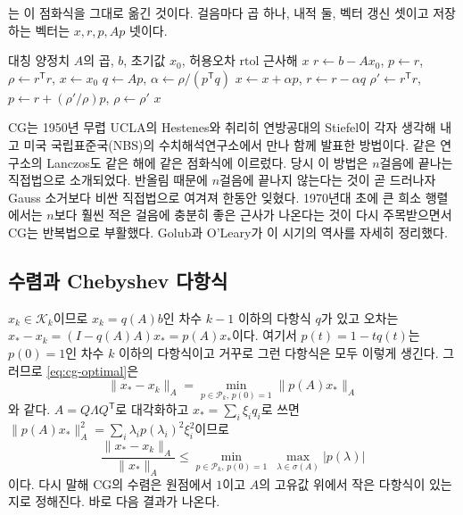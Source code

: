 는 이 점화식을 그대로 옮긴 것이다. 걸음마다 곱 하나, 내적 둘, 벡터 갱신 셋이고 저장하는 벡터는 $x,r,p,Ap$ 넷이다.

\begin{algorithm}[t]
\begin{algorithmic}[1]
\Require 대칭 양정치 $A$의 곱, $b$, 초기값 $x_0$, 허용오차 $\mathrm{rtol}$
\Ensure 근사해 $x$
\State $r\gets b-Ax_0$, $p\gets r$, $\rho\gets r^{\mathsf T}r$, $x\gets x_0$
  \State $q\gets Ap$, $\alpha\gets\rho/(p^{\mathsf T}q)$
  \State $x\gets x+\alpha p$, $r\gets r-\alpha q$ 
  \State $\rho'\gets r^{\mathsf T}r$, $p\gets r+(\rho'/\rho)p$, $\rho\gets\rho'$
\EndWhile
\State \Return $x$
\end{algorithmic}
\caption{켤레 기울기법}
\label{alg:cg}
\end{algorithm}

\begin{aside}
CG는 1950년 무렵 UCLA의 Hestenes와 취리히 연방공대의 Stiefel이 각자 생각해 내고 미국 국립표준국(NBS)의 수치해석연구소에서 만나 함께 발표한 방법이다\cite{hestenes1952}. 같은 연구소의 Lanczos도 같은 해에 같은 점화식에 이르렀다\cite{lanczos1952}. 당시 이 방법은 $n$걸음에 끝나는 직접법으로 소개되었다. 반올림 때문에 $n$걸음에 끝나지 않는다는 것이 곧 드러나자 Gauss 소거보다 비싼 직접법으로 여겨져 한동안 잊혔다. 1970년대 초에 큰 희소 행렬에서는 $n$보다 훨씬 적은 걸음에 충분히 좋은 근사가 나온다는 것이 다시 주목받으면서 CG는 반복법으로 부활했다. Golub과 O'Leary가 이 시기의 역사를 자세히 정리했다\cite{golub1989history}.
\end{aside}

\subsection{수렴과 Chebyshev 다항식}

$x_k\in\mathcal K_k$이므로 $x_k=q(A)b$인 차수 $k-1$ 이하의 다항식 $q$가 있고 오차는 $x_\ast-x_k=(I-q(A)A)x_\ast=p(A)x_\ast$이다. 여기서 $p(t)=1-tq(t)$는 $p(0)=1$인 차수 $k$ 이하의 다항식이고 거꾸로 그런 다항식은 모두 이렇게 생긴다. 그러므로 \eqref{eq:cg-optimal}은
\[
\|x_\ast-x_k\|_A=\min_{p\in\mathcal P_k,\,p(0)=1}\|p(A)x_\ast\|_A
\]
와 같다. $A=Q\Lambda Q^{\mathsf T}$로 대각화하고 $x_\ast=\sum_i\xi_iq_i$로 쓰면 $\|p(A)x_\ast\|_A^2=\sum_i\lambda_ip(\lambda_i)^2\xi_i^2$이므로
\begin{equation}
\label{eq:cg-minmax}
\frac{\|x_\ast-x_k\|_A}{\|x_\ast\|_A}\le\min_{p\in\mathcal P_k,\,p(0)=1}\ \max_{\lambda\in\sigma(A)}|p(\lambda)|
\end{equation}
이다. 다시 말해 CG의 수렴은 원점에서 $1$이고 $A$의 고유값 위에서 작은 다항식이 있는지로 정해진다. 바로 다음 결과가 나온다.

